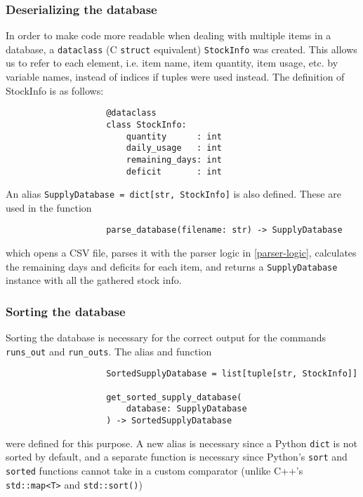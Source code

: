 \documentclass{article}
\begin{document}
			\subsubsection{Deserializing the database}
				In order to make code more readable when dealing with multiple items in a database, a
				\verb|dataclass| (C \verb|struct| equivalent) \verb|StockInfo| was created. This allows us
				to refer to each element, i.e. item name, item quantity, item usage, etc. by variable names,
				instead of indices if tuples were used instead. The definition of StockInfo is as follows:

				\begin{verbatim}
					@dataclass
					class StockInfo:
						quantity      : int
						daily_usage   : int
						remaining_days: int
						deficit       : int
				\end{verbatim}

				An alias \verb|SupplyDatabase = dict[str, StockInfo]| is also defined. These are used in the
				function

				\begin{verbatim}
					parse_database(filename: str) -> SupplyDatabase
				\end{verbatim}

				which opens a CSV file, parses it with the parser logic in \ref{parser-logic}, calculates
				the remaining days and deficits for each item, and returns a \verb|SupplyDatabase| instance
				with all the gathered stock info.

			\subsubsection{Sorting the database}
				Sorting the database is necessary for the correct output for the commands \verb|runs_out|
				and \verb|run_outs|. The alias and function

				\begin{verbatim}
					SortedSupplyDatabase = list[tuple[str, StockInfo]]

					get_sorted_supply_database(
						database: SupplyDatabase
					) -> SortedSupplyDatabase
				\end{verbatim}

				were defined for this purpose. A new alias is necessary since a Python \verb|dict| is not
				sorted by default, and a separate function is necessary since Python's \verb|sort| and
				\verb|sorted| functions cannot take in a custom comparator (unlike C++'s \verb|std::map<T>|
				and \verb|std::sort()|)
\end{document}
